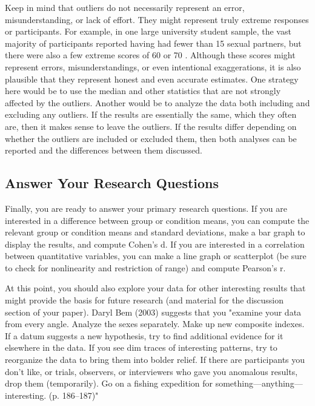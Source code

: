 Keep in mind that outliers do not necessarily represent an error, misunderstanding, or lack of effort. They might represent truly extreme responses or participants. For example, in one large university student sample, the vast majority of participants reported having had fewer than 15 sexual partners, but there were also a few extreme scores of 60 or 70 \citep{brown_estimating_1999}. Although these scores might represent errors, misunderstandings, or even intentional exaggerations, it is also plausible that they represent honest and even accurate estimates. One strategy here would be to use the median and other statistics that are not strongly affected by the outliers. Another would be to analyze the data both including and excluding any outliers. If the results are essentially the same, which they often are, then it makes sense to leave the outliers. If the results differ depending on whether the outliers are included or excluded them, then both analyses can be reported and the differences between them discussed.

\subsection{Answer Your Research Questions}

Finally, you are ready to answer your primary research questions. If you are interested in a difference between group or condition means, you can compute the relevant group or condition means and standard deviations, make a bar graph to display the results, and compute Cohen's d. If you are interested in a correlation between quantitative variables, you can make a line graph or scatterplot (be sure to check for nonlinearity and restriction of range) and compute Pearson's r.

At this point, you should also explore your data for other interesting results that might provide the basis for future research (and material for the discussion section of your paper). Daryl Bem (2003) suggests that you "examine your data from every angle. Analyze the sexes separately. Make up new composite indexes. If a datum suggests a new hypothesis, try to find additional evidence for it elsewhere in the data. If you see dim traces of interesting patterns, try to reorganize the data to bring them into bolder relief. If there are participants you don't like, or trials, observers, or interviewers who gave you anomalous results, drop them (temporarily). Go on a fishing expedition for something---anything---interesting. (p. 186–187)"


